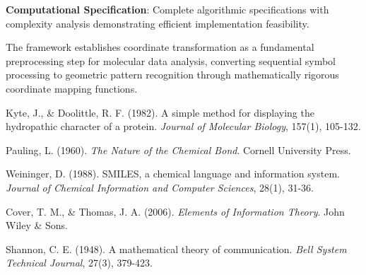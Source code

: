 \documentclass[12pt,a4paper]{article}
\begin{document}
\textbf{Computational Specification}: Complete algorithmic specifications with complexity analysis demonstrating efficient implementation feasibility.

The framework establishes coordinate transformation as a fundamental preprocessing step for molecular data analysis, converting sequential symbol processing to geometric pattern recognition through mathematically rigorous coordinate mapping functions.


\begin{thebibliography}{99}

Kyte, J., \& Doolittle, R. F. (1982). A simple method for displaying the hydropathic character of a protein. \textit{Journal of Molecular Biology}, 157(1), 105-132.

Pauling, L. (1960). \textit{The Nature of the Chemical Bond}. Cornell University Press.

Weininger, D. (1988). SMILES, a chemical language and information system. \textit{Journal of Chemical Information and Computer Sciences}, 28(1), 31-36.

Cover, T. M., \& Thomas, J. A. (2006). \textit{Elements of Information Theory}. John Wiley \& Sons.

Shannon, C. E. (1948). A mathematical theory of communication. \textit{Bell System Technical Journal}, 27(3), 379-423.

\end{thebibliography}
\end{document}
